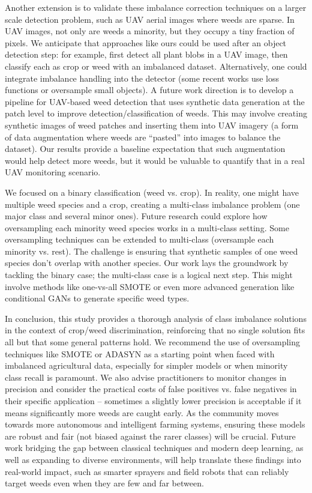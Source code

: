 \documentclass[agriengineering,article,submit,pdftex,moreauthors]{Definitions/mdpi}
\begin{document}
Another extension is to validate these imbalance correction techniques on a larger scale detection problem, such as UAV aerial images where weeds are sparse. In UAV images, not only are weeds a minority, but they occupy a tiny fraction of pixels. We anticipate that approaches like ours could be used after an object detection step: for example, first detect all plant blobs in a UAV image, then classify each as crop or weed with an imbalanced dataset. Alternatively, one could integrate imbalance handling into the detector (some recent works use loss functions or oversample small objects). A future work direction is to develop a pipeline for UAV-based weed detection that uses synthetic data generation at the patch level to improve detection/classification of weeds. This may involve creating synthetic images of weed patches and inserting them into UAV imagery (a form of data augmentation where weeds are “pasted” into images to balance the dataset). Our results provide a baseline expectation that such augmentation would help detect more weeds, but it would be valuable to quantify that in a real UAV monitoring scenario.

We focused on a binary classification (weed vs. crop). In reality, one might have multiple weed species and a crop, creating a multi-class imbalance problem (one major class and several minor ones). Future research could explore how oversampling each minority weed species works in a multi-class setting. Some oversampling techniques can be extended to multi-class (oversample each minority vs. rest). The challenge is ensuring that synthetic samples of one weed species don’t overlap with another species. Our work lays the groundwork by tackling the binary case; the multi-class case is a logical next step. This might involve methods like one-vs-all SMOTE or even more advanced generation like conditional GANs to generate specific weed types.

In conclusion, this study provides a thorough analysis of class imbalance solutions in the context of crop/weed discrimination, reinforcing that no single solution fits all but that some general patterns hold. We recommend the use of oversampling techniques like SMOTE or ADASYN as a starting point when faced with imbalanced agricultural data, especially for simpler models or when minority class recall is paramount. We also advise practitioners to monitor changes in precision and consider the practical costs of false positives vs. false negatives in their specific application – sometimes a slightly lower precision is acceptable if it means significantly more weeds are caught early. As the community moves towards more autonomous and intelligent farming systems, ensuring these models are robust and fair (not biased against the rarer classes) will be crucial. Future work bridging the gap between classical techniques and modern deep learning, as well as expanding to diverse environments, will help translate these findings into real-world impact, such as smarter sprayers and field robots that can reliably target weeds even when they are few and far between.
\end{document}
